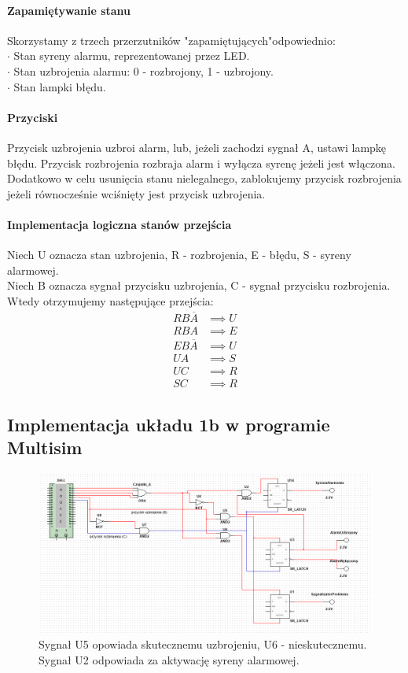\documentclass{article}
\begin{document}
\paragraph{Zapamiętywanie stanu}
Skorzystamy z trzech przerzutników "zapamiętujących"odpowiednio: \\
$\cdot$ Stan syreny alarmu, reprezentowanej przez LED. \\
$\cdot$ Stan uzbrojenia alarmu: 0 - rozbrojony, 1 - uzbrojony. \\
$\cdot$ Stan lampki błędu. \\
\paragraph{Przyciski}
Przycisk uzbrojenia uzbroi alarm, lub, jeżeli zachodzi sygnał A, ustawi lampkę błędu.
Przycisk rozbrojenia rozbraja alarm i wyłącza syrenę jeżeli jest włączona.
Dodatkowo w celu usunięcia stanu nielegalnego, zablokujemy przycisk rozbrojenia jeżeli równocześnie wciśnięty jest przycisk uzbrojenia.
\paragraph{Implementacja logiczna stanów przejścia}
Niech U oznacza stan uzbrojenia, R - rozbrojenia, E - błędu, S - syreny alarmowej. \\
Niech B oznacza sygnał przycisku uzbrojenia, C - sygnał przycisku rozbrojenia. \\
Wtedy otrzymujemy następujące przejścia:
\begin{align*}
RB\overline{A} &\implies U \\
RBA &\implies E \\
EB\overline{A} &\implies U \\
UA &\implies S \\
UC &\implies R \\
SC &\implies R
\end{align*}
\subsection{Implementacja układu 1b w programie Multisim}
\begin{figure}[h!]
\includegraphics[width=\textwidth]{1b}
\caption{Sygnał U5 opowiada skutecznemu uzbrojeniu, U6 - nieskutecznemu. Sygnał U2 odpowiada za aktywację syreny alarmowej.}
\end{figure}
\end{document}
